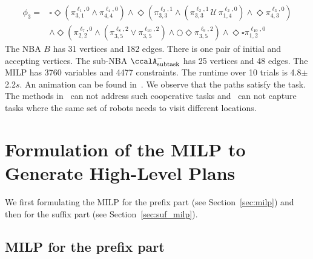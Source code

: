 \documentclass[Afour,sageh,times]{sagej}
\newcommand{\auto}[1]{\ccalA_{\textup{#1}}}
\newcommand{\aap}[4]{\mathcal{\pi}_{{#1},{#2}}^{#3,#4}}
\begin{document}
{{\small
\begingroup
\begin{align*}
  \phi_3 = &  \square \Diamond (\pi^{\ell_1,0}_{3,1} \wedge \pi^{\ell_4, 0}_{4,4}) \wedge \Diamond ( \pi^{\ell_2,1}_{3,3} \wedge  (\pi^{\ell_2,1}_{3,3} \,\mathcal{U} \, \pi^{\ell_2,0}_{1,4})  \wedge \Diamond \pi_{4,3}^{\ell_3,0})   \nonumber \\ & \wedge \Diamond (\aap{2}{2}{\ell_7}{0} \wedge (\aap{3}{5}{\ell_8}{2} \vee \aap{3}{5}{\ell_{10}}{2}) \wedge \bigcirc  \Diamond  \aap{3}{5}{\ell_{9}}{2} ) \wedge \Diamond \square \aap{1}{2}{\ell_{10}}{0}
\end{align*}
\endgroup
\normalsize
The NBA $B$ has 31 vertices and 182 edges. There is one pair of initial and accepting vertices. The sub-NBA $\auto{subtask}^-$ has 25 vertices and 48 edges. The MILP has 3760 variables and 4477 constraints. The runtime over 10 trials is 4.8$\pm$2.2$s$. {An animation can be found in~\cite{ltlmrta}.} We observe that the paths satisfy the task. The methods in~\cite{schillinger2018decomposition,schillinger2018simultaneous,faruq2018simultaneous} can not address such cooperative tasks and~\cite{sahin2017provably,sahin2017synchronous,sahin2019multi,sahin2019multirobot} can not capture tasks where the same set of robots needs to visit different locations.


\appendix
\section{Formulation of the MILP to Generate High-Level Plans}
We first formulating the MILP for the prefix part (see Section~\ref{sec:milp}) and then for the suffix part (see Section~\ref{sec:suf_milp}).
\subsection{MILP for the prefix part}\label{app:appendix_prefix_milp}
}}
\end{document}
